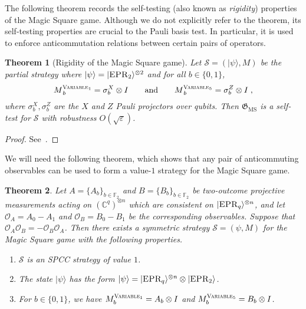 \documentclass[11pt]{article}
\newtheorem{theorem}{Theorem}[section]
\theoremstyle{definition}
\newcommand{\ket}[1]{|#1\rangle}
\newcommand{\C}{\ensuremath{\mathbb{C}}}
\newcommand{\F}{\ensuremath{\mathbb{F}}}
\newcommand{\eps}{\varepsilon}
\newcommand{\game}{\mathfrak{G}}
\newcommand{\strategy}{\mathscr{S}}
\newcommand{\labelstyle}[1]{\ensuremath{\textsc{#1}}\xspace}
\newcommand{\EPR}{\labelstyle{EPR}}
\newcommand{\typestyle}[1]{\ensuremath{\textsc{#1}}\xspace}
\newcommand{\Variable}{\typestyle{Variable}}
\newcommand{\MS}{\mathrm{MS}}
\begin{document}
The following theorem records the self-testing (also known as \emph{rigidity})
properties of the Magic Square game.
Although we do not explicitly refer to the theorem, its self-testing properties
are crucial to the Pauli basis test.
In particular, it is used to enforce anticommutation relations between certain
pairs of operators.

\begin{theorem}[Rigidity of the Magic Square game]
  \label{thm:ms-rigidity}
	Let $\strategy = (\ket{\psi}, M)$ be the partial strategy where $\ket{\psi} =
  \ket{\EPR_2}^{\otimes 2}$ and for all $b \in \{0, 1\}$,
  \begin{equation*}
		M^{\Variable_1}_{\, b} = \sigma^{X}_b \otimes I \qquad \text{and}
    \qquad M^{\Variable_5}_{\, b} = \sigma^{Z}_b \otimes I\;,
  \end{equation*}
	where $\sigma^X_b, \sigma^Z_b$ are the $X$ and
  $Z$ Pauli projectors over qubits.
  Then $\game_\MS$ is a self-test for
  $\strategy$ with robustness $O(\sqrt{\eps})$.
\end{theorem}
\begin{proof}
  See~\cite{wu2016device}.
\end{proof}

We will need the following theorem,
which shows that any pair of anticommuting observables 
can be used to form a value-$1$ strategy for the Magic Square game.

\begin{theorem}
  \label{thm:ms-from-ac}
  Let $A = \{A_b\}_{b \in \F_2}$ and $B = \{B_b\}_{b \in \F_2}$ be two-outcome
  projective measurements acting on $(\C^q)^{\otimes n}$ which are consistent on
  $\ket{\EPR_q}^{\otimes n}$, and let $\mathcal{O}_A = A_0 - A_1$ and
  $\mathcal{O}_B = B_0 - B_1$ be the corresponding observables.
  Suppose that $\mathcal{O}_A \mathcal{O}_B = -\mathcal{O}_B \mathcal{O}_A$.
  Then there exists a symmetric strategy $\strategy = (\psi, M)$ for the Magic
  Square game with the following properties.
  \begin{enumerate}
  \item $\strategy$ is an SPCC strategy of value $1$.
  \item The state $\ket{\psi}$ has the form $\ket{\psi} = \ket{\EPR_q}^{\otimes
      n} \otimes \ket{\EPR_2}$.
  \item For $b \in \{0,1\}$, we have $M^{\Variable_1}_b = A_b \otimes I$ and
    $M^{\Variable_5}_b = B_b \otimes I$.\label{item:embeds}
  \end{enumerate}
\end{theorem}
\end{document}
